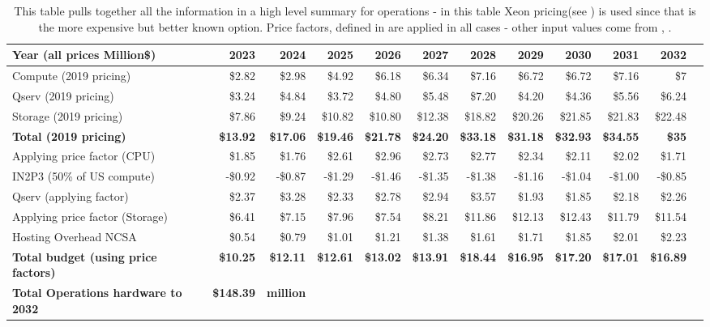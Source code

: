 \tiny \begin{longtable} { |p{}  |r  |r  |r  |r  |r  |r  |r  |r  |r  |r  |r |} 
\caption{This table pulls together all the information in a high level summary for operations - in this table Xeon pricing(see ) is used since that is the more expensive but better known option. Price factors, defined in  are applied in all cases - other input values come from , .
 \label{tab:opsSummary}}\\ 
\hline 
\textbf{Year  (all prices Million\$)}&\textbf{2023}&\textbf{2024}&\textbf{2025}&\textbf{2026}&\textbf{2027}&\textbf{2028}&\textbf{2029}&\textbf{2030}&\textbf{2031}&\textbf{2032} \\ \hline
{Compute (2019 pricing)}&{\$2.82}&{\$2.98}&{\$4.92}&{\$6.18}&{\$6.34}&{\$7.16}&{\$6.72}&{\$6.72}&{\$7.16}&{\$7} \\ \hline
{Qserv (2019 pricing)}&{\$3.24}&{\$4.84}&{\$3.72}&{\$4.80}&{\$5.48}&{\$7.20}&{\$4.20}&{\$4.36}&{\$5.56}&{\$6.24} \\ \hline
{Storage (2019 pricing)}&{\$7.86}&{\$9.24}&{\$10.82}&{\$10.80}&{\$12.38}&{\$18.82}&{\$20.26}&{\$21.85}&{\$21.83}&{\$22.48} \\ \hline
\textbf{Total (2019 pricing)}&\textbf{\$13.92}&\textbf{\$17.06}&\textbf{\$19.46}&\textbf{\$21.78}&\textbf{\$24.20}&\textbf{\$33.18}&\textbf{\$31.18}&\textbf{\$32.93}&\textbf{\$34.55}&\textbf{\$35} \\ \hline
{Applying price factor (CPU)}&{\$1.85}&{\$1.76}&{\$2.61}&{\$2.96}&{\$2.73}&{\$2.77}&{\$2.34}&{\$2.11}&{\$2.02}&{\$1.71} \\ \hline
{IN2P3 (50\% of US compute)}&{-\$0.92}&{-\$0.87}&{-\$1.29}&{-\$1.46}&{-\$1.35}&{-\$1.38}&{-\$1.16}&{-\$1.04}&{-\$1.00}&{-\$0.85} \\ \hline
{Qserv (applying factor)}&{\$2.37}&{\$3.28}&{\$2.33}&{\$2.78}&{\$2.94}&{\$3.57}&{\$1.93}&{\$1.85}&{\$2.18}&{\$2.26} \\ \hline
{Applying price factor (Storage)}&{\$6.41}&{\$7.15}&{\$7.96}&{\$7.54}&{\$8.21}&{\$11.86}&{\$12.13}&{\$12.43}&{\$11.79}&{\$11.54} \\ \hline
{Hosting Overhead NCSA
}&{\$0.54}&{\$0.79}&{\$1.01}&{\$1.21}&{\$1.38}&{\$1.61}&{\$1.71}&{\$1.85}&{\$2.01}&{\$2.23} \\ \hline
\textbf{Total budget (using price factors)}&\textbf{\$10.25}&\textbf{\$12.11}&\textbf{\$12.61}&\textbf{\$13.02}&\textbf{\$13.91}&\textbf{\$18.44}&\textbf{\$16.95}&\textbf{\$17.20}&\textbf{\$17.01}&\textbf{\$16.89} \\ \hline
\textbf{Total Operations hardware to 2032 }&\textbf{\$148.39}&\textbf{million}&&&&&&&& \\ \hline
\end{longtable} \normalsize
